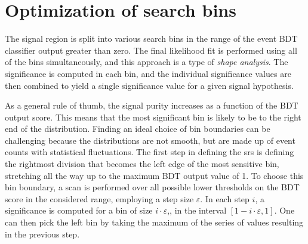 \clearpage
\section{Optimization of search bins}
\label{sec:signal-regions}

The signal region is split into various search bins in the range of the event BDT classifier output greater than zero. The final likelihood fit is performed using all of the bins simultaneously, and this approach is a type of \emph{shape analysis}. The significance is computed in each bin, and the individual significance values are then combined to yield a single significance value for a given signal hypothesis.

As a general rule of thumb, the signal purity increases as a function of the BDT output score. This means that the most significant bin is likely to be to the right end of the distribution. Finding an ideal choice of bin boundaries can be challenging because the distributions are not smooth, but are made up of event counts with statistical fluctuations. The first step in defining the \glspl{sr} is defining the rightmost division that becomes the left edge of the most sensitive bin, stretching all the way up to the maximum BDT output value of 1. To choose this bin boundary, a scan is performed over all possible lower thresholds on the BDT score in the considered range, employing a step size $\varepsilon$. In each step $i$, a significance is computed for a bin of size $i\cdot \varepsilon$,\ie, in the interval $\left[ 1-i\cdot \varepsilon, 1 \right]$. One can then pick the left bin by taking the maximum of the series of values resulting in the previous step.

